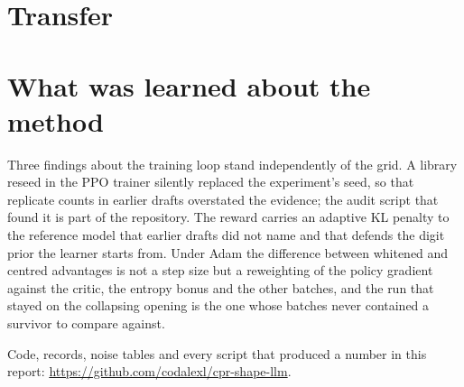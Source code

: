 \section{Transfer}


\section{What was learned about the method}

Three findings about the training loop stand independently of the grid.
A library reseed in the PPO trainer silently replaced the experiment's
seed, so that replicate counts in earlier drafts overstated the evidence;
the audit script that found it is part of the repository.
The reward carries an adaptive KL penalty to the reference model that
earlier drafts did not name and that defends the digit prior the learner
starts from.
Under Adam the difference between whitened and centred advantages is not
a step size but a reweighting of the policy gradient against the critic,
the entropy bonus and the other batches, and the run that stayed on the
collapsing opening is the one whose batches never contained a survivor to
compare against.

Code, records, noise tables and every script that produced a number in
this report: \url{https://github.com/codalexl/cpr-shape-llm}.
